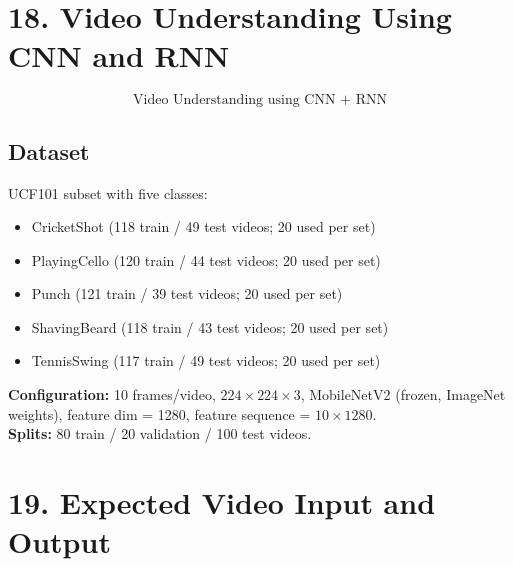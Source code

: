 \documentclass[10pt]{article}
\begin{document}
\section*{18. Video Understanding Using CNN and RNN}

\[
\boxed{\text{Video Understanding using CNN + RNN}}
\]

\begin{center}
\end{center}

\subsection*{Dataset}

UCF101 subset with five classes:

\begin{itemize}
\item CricketShot (118 train / 49 test videos; 20 used per set)
\item PlayingCello (120 train / 44 test videos; 20 used per set)
\item Punch (121 train / 39 test videos; 20 used per set)
\item ShavingBeard (118 train / 43 test videos; 20 used per set)
\item TennisSwing (117 train / 49 test videos; 20 used per set)
\end{itemize}

\textbf{Configuration:} 10 frames/video, $224\times224\times3$,
MobileNetV2 (frozen, ImageNet weights), feature dim = 1280,
feature sequence = $10\times1280$.\\
\textbf{Splits:} 80 train / 20 validation / 100 test videos.

\section*{19. Expected Video Input and Output}
\end{document}
